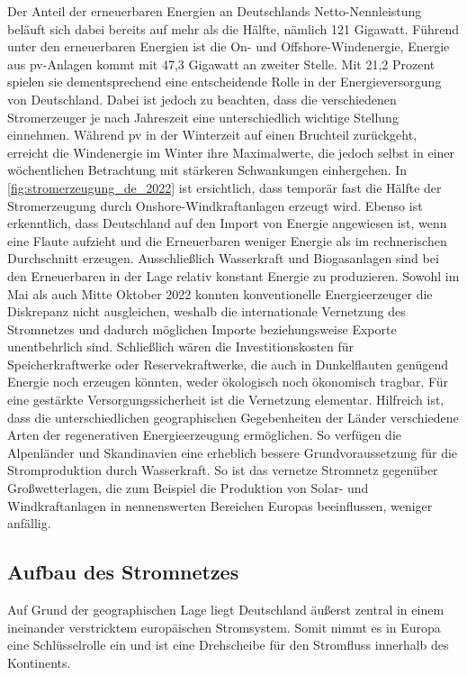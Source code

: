 \documentclass[12pt, a4paper]{article}
\begin{document}
Der Anteil der erneuerbaren Energien an Deutschlands Netto-Nennleistung beläuft sich dabei bereits auf mehr als die Hälfte, nämlich 121 Gigawatt. Führend unter den erneuerbaren Energien ist die On- und Offshore-Windenergie, Energie aus \ac{pv}-Anlagen kommt mit 47,3 Gigawatt an zweiter Stelle. Mit 21,2 Prozent spielen sie dementsprechend eine entscheidende Rolle in der Energieversorgung von Deutschland. Dabei ist jedoch zu beachten, dass die verschiedenen Stromerzeuger je nach Jahreszeit eine unterschiedlich wichtige Stellung einnehmen. Während \ac{pv} in der Winterzeit auf einen Bruchteil zurückgeht, erreicht die Windenergie im Winter ihre Maximalwerte, die jedoch selbst in einer wöchentlichen Betrachtung mit stärkeren Schwankungen einhergehen. In \autoref{fig:stromerzeugung_de_2022} ist ersichtlich, dass temporär fast die Hälfte der Stromerzeugung durch Onshore-Windkraftanlagen erzeugt wird. Ebenso ist erkenntlich, dass Deutschland auf den Import von Energie angewiesen ist, wenn eine Flaute aufzieht und die Erneuerbaren weniger Energie als im rechnerischen Durchschnitt erzeugen. Ausschließlich Wasserkraft und Biogasanlagen sind bei den Erneuerbaren in der Lage relativ konstant Energie zu produzieren. Sowohl im Mai als auch Mitte Oktober 2022 konnten konventionelle Energieerzeuger die Diskrepanz nicht ausgleichen, weshalb die internationale Vernetzung des Stromnetzes und dadurch möglichen Importe beziehungsweise Exporte unentbehrlich sind. Schließlich wären die Investitionskosten für Speicherkraftwerke oder Reservekraftwerke, die auch in Dunkelflauten genügend Energie noch erzeugen könnten, weder ökologisch noch ökonomisch tragbar. Für eine gestärkte Versorgungssicherheit ist die Vernetzung elementar. Hilfreich ist, dass die unterschiedlichen geographischen Gegebenheiten der Länder verschiedene Arten der regenerativen Energieerzeugung ermöglichen. So verfügen die Alpenländer und Skandinavien eine erheblich bessere Grundvoraussetzung für die Stromproduktion durch Wasserkraft. So ist das vernetze Stromnetz gegenüber Großwetterlagen, die zum Beispiel die Produktion von Solar- und Windkraftanlagen in nennenswerten Bereichen Europas beeinflussen, weniger anfällig.


\subsection{Aufbau des Stromnetzes}

Auf Grund der geographischen Lage liegt Deutschland äußerst zentral in einem ineinander verstricktem europäischen Stromsystem. Somit nimmt es in Europa eine Schlüsselrolle ein und ist eine Drehscheibe für den Stromfluss innerhalb des Kontinents.
\end{document}
